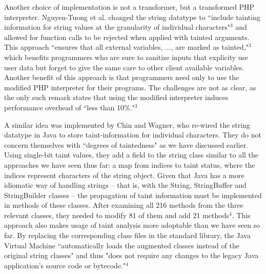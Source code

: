 \documentclass[11pt]{article}
\begin{document}
Another choice of implementation is not a transformer, but a transformed PHP 
interpreter. Nguyen-Tuong et al. changed the string datatype
to ``include tainting information for string values at the granularity of 
individual characters"$^3$ and allowed for function calls to be rejected 
when applied with tainted arguments. This approach ``ensures that all external 
variables, ..., are marked as tainted,"$^3$ which benefits programmers who are sure 
to sanitize inputs that explicity use user data but forget to give the same 
care to other client available variables. Another benefit of this approach 
is that programmers
need only to use the modified PHP interpreter for their programs. 
The challenges are not as clear, as the only such remark states that using 
the modified interpreter induces performance overhead of ``less than 10\%."$^3$ 

A similar idea was implemented by Chin and Wagner, who re-wired the string datatype
in Java to store taint-information for individual characters. They do not concern
themselves with ``degrees of taintedness" as we have discussed earlier. Using single-bit
taint values, they add a field to the string class similar to all the approaches we have
seen thus far: a map from indices to taint status, where the indices represent 
characters of the string object. Given that Java has a more idiomatic way of handling
strings -- that is, with the String, StringBuffer and StringBuilder classes -- 
the propagation of taint information must be implemented in methods of these classes.
After examining all 216 methods from the three relevant classes, they needed to modify 
81 of them and add 21 methods$^4$. This approach also makes usage of taint analysis
more adoptable than we have seen so far.
By replacing the corresponding class files in the 
standard library, the Java Virtual Machine ``automatically loads the augmented
classes instead of the original string classes" and thus "does not require any
changes to the legacy Java application's source code or bytecode."$^4$ 
 

%
%
\end{document}

